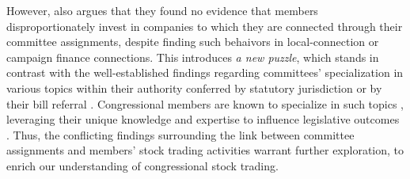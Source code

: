 \documentclass[15pt,letterpaper]{article}
\begin{document}
However, \cite{eg14} also argues that they found no evidence that members disproportionately invest in companies to which they are connected through their committee assignments, despite finding such behaivors in local-connection or campaign finance connections. This introduces \textit{a new puzzle}, which stands in contrast with the well-established findings regarding committees' specialization in various topics within their authority conferred by statutory jurisdiction \citep{myers2009} or by their bill referral \citep{king1994}.
Congressional members are known to specialize in such topics \citep{asher1974}, leveraging their unique knowledge and expertise to influence legislative outcomes \citep{10.2307/40709444, 10.2307/2111156, kiewiet1991logic, krehbiel1992information, curry2018knowledge}. Thus, the conflicting findings surrounding the link between committee assignments and members' stock trading activities warrant further exploration, to enrich our understanding of congressional stock trading.

\end{document}
